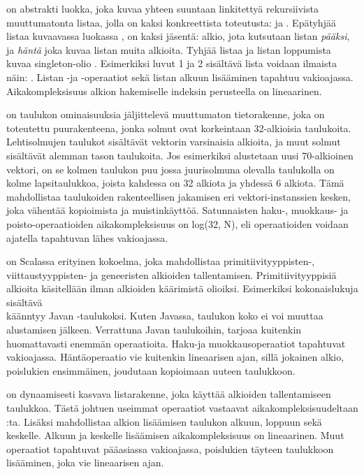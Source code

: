  on abstrakti luokka, joka kuvaa yhteen suuntaan linkitettyä rekursiivista muuttumatonta listaa, jolla on kaksi konkreettista toteutusta: \code{::} ja . Epätyhjää listaa kuvaavassa luokassa \code{::}, on kaksi jäsentä: alkio, jota kutsutaan listan \textit{pääksi}, ja \textit{häntä} joka kuvaa listan muita alkioita. Tyhjää listaa ja listan loppumista kuvaa singleton-olio . Esimerkiksi luvut 1 ja 2 sisältävä lista voidaan ilmaista näin: . Listan -ja -operaatiot sekä listan alkuun lisääminen tapahtuu vakioajassa. Aikakompleksisuus alkion hakemiselle indeksin perusteella on lineaarinen.
\cite{scalaAPI}
\cite{scalaCollections}

 on taulukon ominaisuuksia jäljittelevä muuttumaton tietorakenne, joka on toteutettu puurakenteena, jonka solmut ovat korkeintaan 32-alkioisia taulukoita. Lehtisolmujen taulukot sisältävät vektorin varsinaisia alkioita, ja muut solmut sisältävät alemman tason taulukoita. Jos esimerkiksi alustetaan uusi 70-alkioinen vektori, on se kolmen taulukon puu jossa juurisolmuna olevalla taulukolla on kolme lapsitaulukkoa, joista kahdessa on 32 alkiota ja yhdessä 6 alkiota. Tämä mahdollistaa taulukoiden rakenteellisen jakamisen eri vektori-instanssien kesken, joka vähentää kopioimista ja muistinkäyttöä. Satunnaisten haku-, muokkaus- ja poisto-operaatioiden aikakompleksisuus on log(32, N), eli operaatioiden voidaan ajatella tapahtuvan lähes vakioajassa.
\cite{scalaCollections}
\cite[Luku 4]{highPerformanceProgramming}

 on Scalassa erityinen kokoelma, joka mahdollistaa primitiivityyppisten-, \\viittaustyyppisten- ja geneeristen alkioiden tallentamisen. Primitiivityyppisiä alkioita käsitellään ilman alkioiden käärimistä olioiksi. Esimerkiksi kokonaislukuja sisältävä \\ käänntyy Javan -taulukoksi. Kuten Javassa, taulukon koko ei voi muuttaa alustamisen jälkeen. Verrattuna Javan taulukoihin,  tarjoaa kuitenkin huomattavasti enemmän operaatioita. Haku-ja muokkausoperaatiot tapahtuvat vakioajassa. Häntäoperaatio vie kuitenkin lineaarisen ajan, sillä jokainen alkio, poislukien ensimmäinen, joudutaan kopioimaan uuteen taulukkoon.
\cite{scalaCollections}

 on dynaamisesti kasvava listarakenne, joka käyttää alkioiden tallentamiseen taulukkoa. Tästä johtuen useimmat operaatiot vastaavat aikakompleksisuudeltaan :ta. Lisäksi  mahdollistaa alkion lisäämisen taulukon alkuun, loppuun sekä keskelle. Alkuun ja keskelle lisäämisen aikakompleksisuus on lineaarinen. Muut operaatiot tapahtuvat pääasiassa vakioajassa, poislukien täyteen taulukkoon lisääminen, joka vie lineaarisen ajan.
\cite{scalaCollections}

